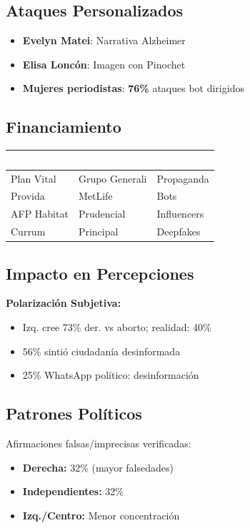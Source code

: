 \vspace{0.3cm}
\subsection{Ataques Personalizados}

\begin{itemize}
    \itemsep=0.12cm
    \item \textbf{Evelyn Matei}: Narrativa Alzheimer
    \item \textbf{Elisa Loncón}: Imagen con Pinochet
    \item \textbf{Mujeres periodistas}: \textbf{76\%} ataques bot dirigidos
\end{itemize}

\subsection{Financiamiento}

\vspace{-0.3cm}
\begin{center}\small
\begin{tabular}{l>{\centering\arraybackslash}m{1.6cm}>{\centering\arraybackslash}m{1.6cm}}
\toprule
\cellcolor{headercolor}\textcolor{white}{\textbf{Entidad}} & \cellcolor{headercolor}\textcolor{white}{\textbf{Controlador}} & \cellcolor{headercolor}\textcolor{white}{\textbf{Actividad}} \\
\midrule
\rowcolor{rowcolor}Plan Vital & Grupo Generali & Propaganda \\
Provida & MetLife & Bots \\
\rowcolor{rowcolor}AFP Habitat & Prudencial & Influencers \\
Currum & Principal & Deepfakes \\
\bottomrule
\end{tabular}
\end{center}
\vspace{-0.2cm}

\subsection{Impacto en Percepciones}

\textbf{Polarización Subjetiva:}
\begin{itemize}
    \itemsep=0.12cm
    \item Izq. cree 73\% der. vs aborto; realidad: 40\%
    \item 56\% sintió ciudadanía desinformada
    \item 25\% WhatsApp político: desinformación
\end{itemize}

\subsection{Patrones Políticos}

Afirmaciones falsas/imprecisas verificadas:

\begin{itemize}
    \itemsep=0.12cm
    \item \textbf{Derecha:} 32\% (mayor falsedades)
    \item \textbf{Independientes:} 32\%
    \item \textbf{Izq./Centro:} Menor concentración
\end{itemize}
